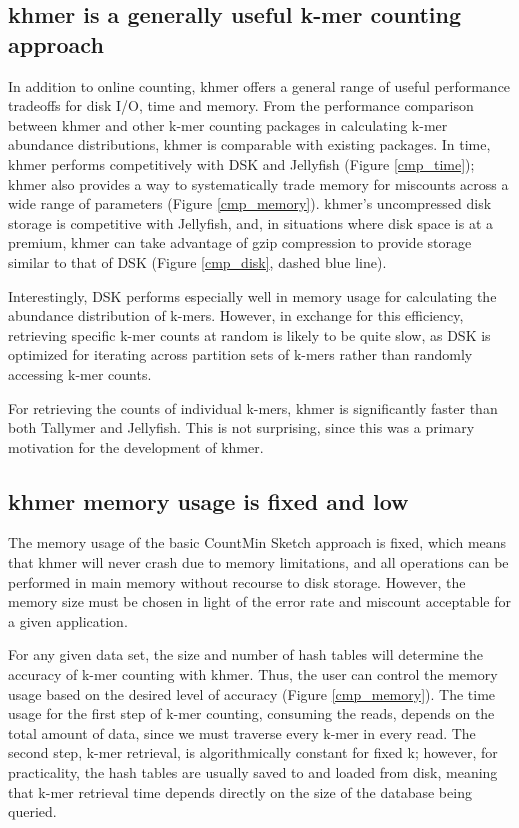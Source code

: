 \documentclass{article}
\begin{document}
\subsection{khmer is a generally useful k-mer counting approach}

In addition to online counting, khmer offers a general range of useful
performance tradeoffs for disk I/O, time and memory.  From the
performance comparison between khmer and other k-mer counting packages
in calculating k-mer abundance distributions, khmer is comparable with
existing packages.  In time, khmer performs competitively with DSK and
Jellyfish (Figure \ref{cmp_time}); khmer also provides a way to systematically trade memory
for miscounts across a wide range of parameters (Figure \ref{cmp_memory}).  khmer's
uncompressed disk storage is competitive with Jellyfish, and, in
situations where disk space is at a premium, khmer can take advantage
of gzip compression to provide storage similar to that of DSK (Figure \ref{cmp_disk}, dashed blue line).

Interestingly, DSK performs especially well in memory usage
for calculating the abundance distribution of k-mers. However, in
exchange for this efficiency, retrieving specific k-mer counts at
random is likely to be quite slow, as DSK is optimized for iterating
across partition sets of k-mers rather than randomly accessing k-mer
counts.

For retrieving the counts of individual k-mers, khmer is significantly faster than both
Tallymer and Jellyfish.  This is not surprising, since this was a
primary motivation for the development of khmer.

\subsection{khmer memory usage is fixed and low}

The memory usage of the basic CountMin Sketch approach is fixed, which
means that khmer will never crash due to memory limitations, and all
operations can be performed in main memory without recourse to disk
storage.  However, the memory size must be chosen in light
of the error rate and miscount acceptable for a given
application.

For any given data set, the size and number of hash tables will
determine the accuracy of k-mer counting with khmer.  Thus, the user
can control the memory usage based on the desired level of
accuracy (Figure \ref{cmp_memory}). The time usage for the first step of k-mer counting,
consuming the reads, depends on the
total amount of data, since we must traverse every k-mer in every read.
The second step, k-mer retrieval, is algorithmically constant for
fixed k; however, for practicality, the hash tables are usually saved
to and loaded from disk, meaning that k-mer retrieval time depends directly
on the size of the database being queried.
\end{document}
